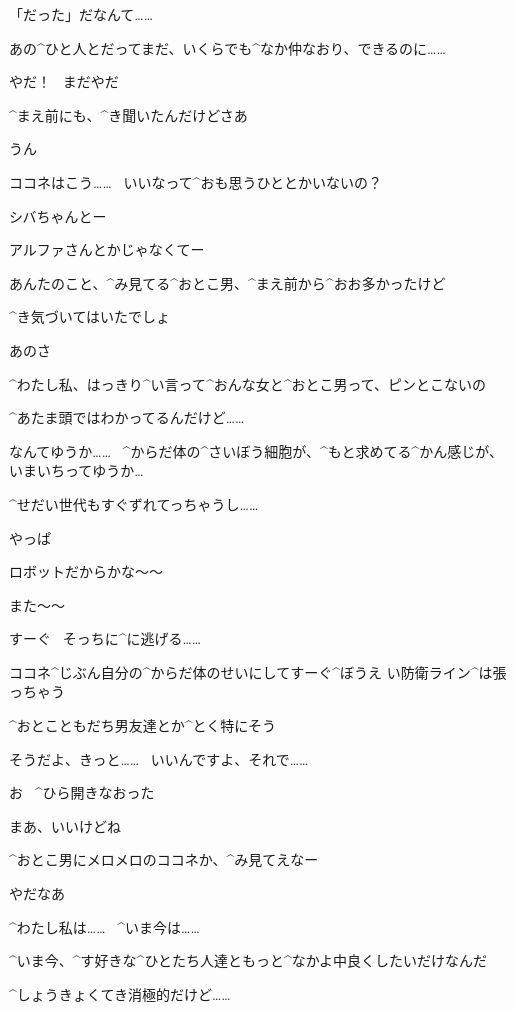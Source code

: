 \Kokone 「だった」だなんて……

\Kokone あの^{ひと}{人}とだってまだ、いくらでも^{なか}{仲}なおり、できるのに……

\Shiba やだ！
\ まだやだ

\page[11]
\Shiba ^{まえ}{前}にも、^{き}{聞}いたんだけどさあ

\Kokone うん

\Shiba ココネはこう……
\ いいなって^{おも}{思}うひととかいないの？

\Kokone シバちゃんとー

\Shiba アルファさんとかじゃなくてー

\page[12]
\Shiba あんたのこと、^{み}{見}てる^{おとこ}{男}、^{まえ}{前}から^{おお}{多}かったけど

\Shiba ^{き}{気}づいてはいたでしょ

\Shiba あのさ

\Kokone ^{わたし}{私}、はっきり^{い}{言}って^{おんな}{女}と^{おとこ}{男}って、ピンとこないの

\Kokone ^{あたま}{頭}ではわかってるんだけど……

\Kokone なんてゆうか……
\ ^{からだ}{体}の^{さいぼう}{細胞}が、^{もと}{求}めてる^{かん}{感}じが、いまいちってゆうか…

\Kokone ^{せだい}{世代}もすぐずれてっちゃうし……

\page[13]
\Kokone やっぱ

\Kokone ロボットだからかな〜〜

\Shiba また〜〜

\Shiba すーぐ
\ そっちに^{に}{逃}げる……

\Shiba ココネ^{じぶん}{自分}の^{からだ}{体}のせいにしてすーぐ^{ぼうえ
  い}{防衛}ライン^{は}{張}っちゃう

\Shiba ^{おとこともだち}{男友達}とか^{とく}{特}にそう

\Kokone そうだよ、きっと……
\ いいんですよ、それで……

\Shiba お
\ ^{ひら}{開}きなおった

\page[14]
\Shiba まあ、いいけどね

\Shiba ^{おとこ}{男}にメロメロのココネか、^{み}{見}てえなー

\Kokone やだなあ

\Kokone ^{わたし}{私}は……
\ ^{いま}{今}は……

\Kokone ^{いま}{今}、^{す}{好}きな^{ひとたち}{人達}ともっと^{なかよ}{中良}くしたいだけなんだ

\Shiba ^{しょうきょくてき}{消極的}だけど……

